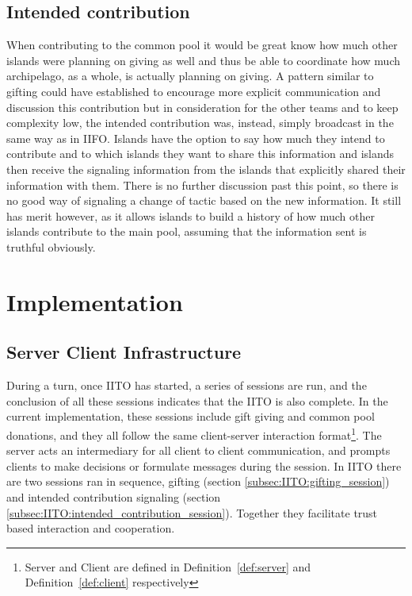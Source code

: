 \subsection{Intended contribution}
\label{subsec:IITO:intended_contribution}
When contributing to the common pool it would be great know how much other islands were planning on giving as well and thus be able to coordinate how much archipelago, as a whole, is actually planning on giving. A pattern similar to gifting could have established to encourage more explicit communication and discussion this contribution but in consideration for the other teams and to keep complexity low, the intended contribution was, instead, simply broadcast in the same way as in IIFO. Islands have the option to say how much they intend to contribute and to which islands they want to share this information and islands then receive the signaling information from the islands that explicitly shared their information with them. There is no further discussion past this point, so there is no good way of signaling a change of tactic based on the new information. It still has merit however, as it allows islands to build a history of how much other islands contribute to the main pool, assuming that the information sent is truthful obviously.
\section{Implementation}
\label{sec:IITO:Implementation}

\subsection{Server Client Infrastructure}
\label{subsec:IITO:server_client_infrastructure}  

During a turn, once IITO has started, a series of sessions are run, and the conclusion of all these sessions indicates that the IITO is also complete. In the current implementation, these sessions include gift giving and common pool donations, and they all follow the same client-server interaction format\footnote{Server and Client are defined in Definition~\ref{def:server} and Definition~\ref{def:client} respectively}. The server acts an intermediary for all client to client communication, and prompts clients to make decisions or formulate messages during the session. In IITO there are two sessions ran in sequence, gifting (section \ref{subsec:IITO:gifting_session}) and intended contribution signaling (section \ref{subsec:IITO:intended_contribution_session}). Together they facilitate trust based interaction and cooperation. 

